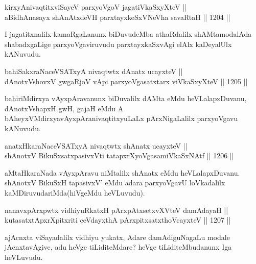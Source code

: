 \begin{shl}
kirxyAnivaqtitxviSayeV parxyoVgoV jagatiVkaSxyXteV || \\
aBidhAnasayx shAnAtxdeVH parxtayxkeSxVNeVha savaRtaH ||  1204 ||  
\end{shl}

\begin{artha}
I jagatitxnalilx kamaRgaLanunx biDuvudeMba athaRdalilx shAMtamodalAda shabadxgaLige parxyoVgaviruvudu parxtayxkaSxvAgi elAlx kaDeyalUlx kANuvudu.
\end{artha}


\begin{shl}
bahiSakxraNaceVSATxyA nivaqtwtx dAnatx ucayxteV || \\
dAnotxV\s shovxV gwgaRjoV vA\s pi parxyoVgasatxtarx viVkaSxyXteV ||  1205 ||  
\end{shl}

\begin{artha}
bahiriMdirxya vAyxpAravanunx biDuvalilx dAMta eMdu heVLalapxDuvanu, dAnotxV\s shapxH gwH, gajaH eMdu A bAheyxVMdirxyavAyxpAranivaqtitxyuLaLx pArxNigaLalilx parxyoVgavu kANuvudu.
\end{artha}


\begin{shl}
anatxHkaraNaceVSATxyA nivaqtwtx shAnatx ucayxteV || \\
shAnotxV BikuSxsatxpasivxVti tatapxrXyoVgasamiVkaSxNAtf ||  1206 ||  
\end{shl}

\begin{artha}
aMtaHkaraNada vAyxpAravu niMtalilx shAnatx eMdu heVLalapxDuvanu. shAnotxV BikuSxH tapasivxV' eMdu adara parxyoVgavU loVkadalilx kaMDiruvudariMda(hiVgeMdu heVLuvudu).
\end{artha}


\begin{shl}
nanavxpArxpwtx vidhiyuRkatxH pArxpAtxsetxvXVteV damAdayaH || \\
kutasatxtApxrXpitxriti ceVdayxthA pArxpitxsatxthoVcayxteV ||  1207 ||  
\end{shl}

\begin{artha}
ajAcnxta viSayadalilx vidhiyu yukatx, Adare damAdiguNagaLu modale jAcnxtavAgive, adu heVge tiLiditeMdare? heVge tiLiditeMbudanunx Iga heVLuvudu.
\end{artha}

